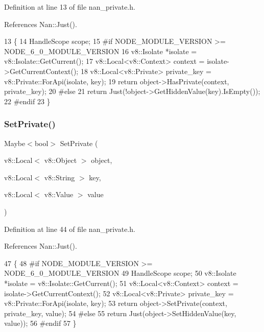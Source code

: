 Definition at line 13 of file nan\+\_\+private.\+h.



References Nan\+::\+Just().


\begin{DoxyCode}
13                                                             \{
14   HandleScope scope;
15 \textcolor{preprocessor}{#if NODE\_MODULE\_VERSION >= NODE\_6\_0\_MODULE\_VERSION}
16   v8::Isolate *isolate = v8::Isolate::GetCurrent();
17   v8::Local<v8::Context> context = isolate->GetCurrentContext();
18   v8::Local<v8::Private> private\_key = v8::Private::ForApi(isolate, key);
19   \textcolor{keywordflow}{return} \textcolor{keywordtype}{object}->HasPrivate(context, private\_key);
20 \textcolor{preprocessor}{#else}
21   \textcolor{keywordflow}{return} Just(!object->GetHiddenValue(key).IsEmpty());
22 \textcolor{preprocessor}{#endif}
23 \}
\end{DoxyCode}
\mbox{\label{nan__private_8h_a4fafa49bdcc6bea791f0c6e3bebc35e3}} 
\subsubsection{Set\+Private()}
{\footnotesize\ttfamily Maybe$<$bool$>$ Set\+Private (\begin{DoxyParamCaption}\item[{v8\+::\+Local$<$ v8\+::\+Object $>$}]{object,  }\item[{v8\+::\+Local$<$ v8\+::\+String $>$}]{key,  }\item[{v8\+::\+Local$<$ v8\+::\+Value $>$}]{value }\end{DoxyParamCaption})}



Definition at line 44 of file nan\+\_\+private.\+h.



References Nan\+::\+Just().


\begin{DoxyCode}
47                             \{
48 \textcolor{preprocessor}{#if NODE\_MODULE\_VERSION >= NODE\_6\_0\_MODULE\_VERSION}
49   HandleScope scope;
50   v8::Isolate *isolate = v8::Isolate::GetCurrent();
51   v8::Local<v8::Context> context = isolate->GetCurrentContext();
52   v8::Local<v8::Private> private\_key = v8::Private::ForApi(isolate, key);
53   \textcolor{keywordflow}{return} \textcolor{keywordtype}{object}->SetPrivate(context, private\_key, value);
54 \textcolor{preprocessor}{#else}
55   \textcolor{keywordflow}{return} Just(object->SetHiddenValue(key, value));
56 \textcolor{preprocessor}{#endif}
57 \}
\end{DoxyCode}
